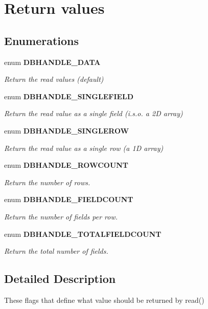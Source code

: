 \section{Return values}
\label{group__DBHANDLE__ReturnFlags}
\subsection*{Enumerations}
\begin{DoxyCompactItemize}
\item 
enum {\bf DBHANDLE\_\-DATA} 
\begin{DoxyCompactList}\small\item\em Return the read values (default) \end{DoxyCompactList}\item 
enum {\bf DBHANDLE\_\-SINGLEFIELD} 
\begin{DoxyCompactList}\small\item\em Return the read value as a single field (i.s.o. a 2D array) \end{DoxyCompactList}\item 
enum {\bf DBHANDLE\_\-SINGLEROW} 
\begin{DoxyCompactList}\small\item\em Return the read value as a single row (a 1D array) \end{DoxyCompactList}\item 
enum {\bf DBHANDLE\_\-ROWCOUNT} 
\begin{DoxyCompactList}\small\item\em Return the number of rows. \end{DoxyCompactList}\item 
enum {\bf DBHANDLE\_\-FIELDCOUNT} 
\begin{DoxyCompactList}\small\item\em Return the number of fields per row. \end{DoxyCompactList}\item 
enum {\bf DBHANDLE\_\-TOTALFIELDCOUNT} 
\begin{DoxyCompactList}\small\item\em Return the total number of fields. \end{DoxyCompactList}\end{DoxyCompactItemize}


\subsection{Detailed Description}
These flags that define what value should be returned by read() 

